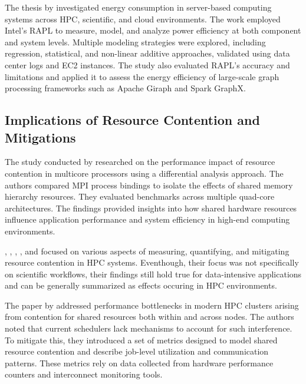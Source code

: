 The thesis by \cite{khan2018energy} investigated energy consumption in server-based computing systems across HPC, scientific, and cloud environments. The work employed Intel's RAPL to measure, model, and analyze power efficiency at both component and system levels. Multiple modeling strategies were explored, including regression, statistical, and non-linear additive approaches, validated using data center logs and EC2 instances. The study also evaluated RAPL's accuracy and limitations and applied it to assess the energy efficiency of large-scale graph processing frameworks such as Apache Giraph and Spark GraphX.

\subsection{Implications of Resource Contention and Mitigations}
\label{sec:relatedwork_contention}

The study conducted by \cite{5470399} researched on the performance impact of resource contention in multicore processors using a differential analysis approach. The authors compared MPI process bindings to isolate the effects of shared memory hierarchy resources. They evaluated benchmarks across multiple quad-core architectures. The findings provided insights into how shared hardware resources influence application performance and system efficiency in high-end computing environments.

\cite{10.1145/1958746.1958815}, \cite{10.1145/1958746.1958815}, \cite{Blagodurov_2012}, \cite{7349920}, \cite{10.1007/978-3-031-48803-0_31} and \cite{10.1002/cpe.3187} focused on various aspects of measuring, quantifying, and mitigating resource contention in HPC systems. Eventhough, their focus was not specifically on scientific workflows, their findings still hold true for data-intensive applications and can be generally summarized as effects occuring in HPC environments.

The paper by \cite{10.1145/1958746.1958815} addressed performance bottlenecks in modern HPC clusters arising from contention for shared resources both within and across nodes. The authors noted that current schedulers lack mechanisms to account for such interference. To mitigate this, they introduced a set of metrics designed to model shared resource contention and describe job-level utilization and communication patterns. These metrics rely on data collected from hardware performance counters and interconnect monitoring tools.

